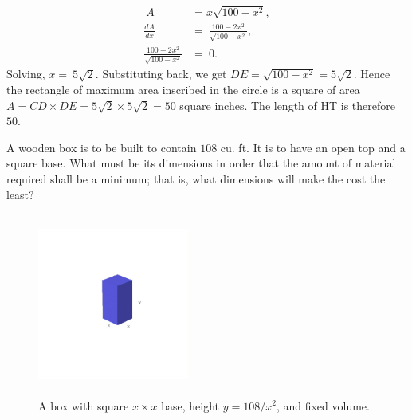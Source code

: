 \begin{example}
{\[
\begin{array}{ll}
\ A 	&= x\sqrt{100 - x^2},\\
  \frac{dA}{dx} &=\ \frac{100 - 2 x^2}{\sqrt{100 - x^2}},\\
  \frac{100 - 2 x^2}{\sqrt{100 - x^2}} 	&=\ 0.
\end{array}
\]
Solving, $ x 	=\ 5\sqrt{2}$.
Substituting back, we get $ DE 	= \sqrt{100 - x^2} = 5\sqrt{2}$.
Hence the rectangle of maximum area inscribed in the circle is 
a square of area
$A = CD \times DE = 5\sqrt{2} \times 5\sqrt{2} = 50$ square inches. 
The length of HT is therefore $50$.

}
\end{example}


\begin{example}
\label{ex:box}
{\rm
A wooden box is to be built to contain $108$ cu. ft. It 
is to have an open top and a square base. What must be its 
dimensions in order that the amount of material required 
shall be a minimum; that is, what dimensions will make the 
cost the least?

\begin{figure}[h!]
\begin{minipage}{\textwidth}
\begin{center}
\includegraphics[height=6cm,width=5cm]{volume-box3b.eps}
\end{center}
\end{minipage}
\caption{A box with square $x\times x$ base, height $y=108/x^2$, 
and fixed volume.}
\label{fig:volume-box}
\end{figure}


}
\end{example}
